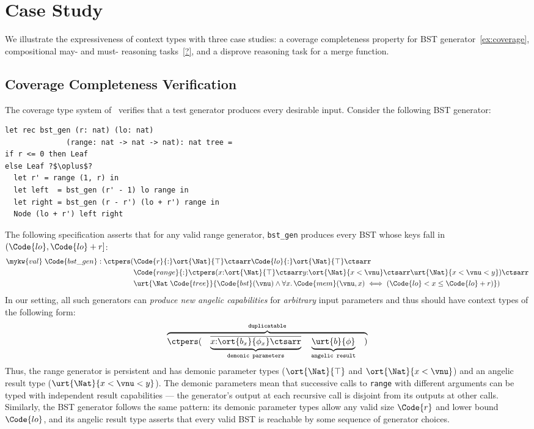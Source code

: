 \section{Case Study}\label{sec:case}

We illustrate the expressiveness of context types with three
case studies: a coverage completeness property for BST generator~\ref{ex:coverage}, 
compositional may- and must- reasoning tasks~\ref{?}, and a disprove
reasoning task for a merge function.

\subsection{Coverage Completeness Verification}
The coverage type system of~\citet{CoverageType} verifies that a
test generator produces every desirable input.
Consider the following BST generator:
\begin{verbatim}    
let rec bst_gen (r: nat) (lo: nat)
              (range: nat -> nat -> nat): nat tree =
if r <= 0 then Leaf
else Leaf ?$\oplus$?
  let r' = range (1, r) in
  let left  = bst_gen (r' - 1) lo range in
  let right = bst_gen (r - r') (lo + r') range in
  Node (lo + r') left right
\end{verbatim}
The following specification asserts that for any valid range generator,
\texttt{bst\_gen} produces every BST whose keys fall in $(\Code{lo},
\Code{lo}+r]$:
\begin{align*}
  \mykw{val}\;\Code{bst\_gen} : \ctpers(&
    \Code{r}{:}\ort{\Nat}{\top} \ctsarr \Code{lo}{:}\ort{\Nat}{\top} \ctsarr
  \\&
    \Code{range}{:}\ctpers (x{:}\ort{\Nat}{\top} \ctsarr
      y{:}\ort{\Nat}{x < \vnu} \ctsarr
      \urt{\Nat}{x < \vnu < y})
    \ctsarr
  \\&
    \urt{\Nat\;\Code{tree}}{\Code{bst}(\vnu) \land
      \forall x.\, \Code{mem}(\vnu, x) \iff
      (\Code{lo} < x \leq \Code{lo}+r)})
\end{align*}\noindent
In our setting, all such generators can \emph{produce new angelic capabilities} for \emph{arbitrary} input parameters and thus should have context types of the following form:
\begin{align*}
    \overbrace{\ctpers (\quad \underbrace{\overline{x{:}\ort{b_x}{\phi_x}\ctsarr}}_{\texttt{demonic parameters}} \quad \underbrace{\urt{b}{\phi}}_{\texttt{angelic result}} \quad )}^{\texttt{duplicatable}}
\end{align*}\noindent
Thus, the range generator is persistent and has demonic parameter types ($\ort{\Nat}{\top}$ and
$\ort{\Nat}{x < \vnu}$) and an angelic result type ($\urt{\Nat}{x <
  \vnu < y}$).  The demonic parameters mean that successive calls to
\texttt{range} with different arguments can be typed with
independent result capabilities — the generator's output at each
recursive call is disjoint from its outputs at other calls.  
Similarly, the BST generator follows the same pattern: its demonic parameter types allow any valid size $\Code{r}$ and lower bound $\Code{lo}$, and its angelic result type asserts that every valid BST is reachable by some sequence of generator choices.


